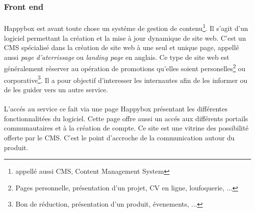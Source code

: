 \documentclass[11pt, a4paper ]{article}
\begin{document}
\subsubsection{Front end}
	\paragraph{}
Happybox est avant toute chose un systéme de gestion de contenu\footnote{appellé aussi CMS, Content Management System}. Il s'agit d'un logiciel permettant la création et la mise à jour dynamique de site web.
C'est un CMS spécialisé dans la création de site web à une seul et unique page, appellé aussi \emph{page d'aterrissage} ou \emph{landing page} en anglais. Ce type de site web est généralement réserver au opération de promotions qu'elles soient personelles\footnote{Pages personnelle, présentation d'un projet, CV en ligne, loufoquerie, ...} ou corporative\footnote{Bon de réduction, présentation d'un produit, évenements, ...}. Il a pour objectif d'interesser les internautes afin de les informer ou de les guider vers un autre service.



\paragraph{}
L'accés au service ce fait via une page Happybox présentant les différentes fonctionnalitées du logiciel. Cette page offre aussi un accés aux différents portails communautaires et à la création de compte. Ce site est une vitrine des possibilité offerte par le CMS. C'est le point d'accroche de la communication autour du produit.

\end{document}

